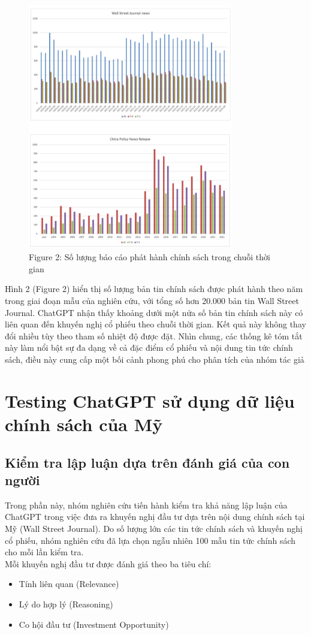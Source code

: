 \documentclass[a4paper,12pt]{article}
\begin{document}
\begin{figure}[H]
    \centering
    \includegraphics[width=0.8\textwidth]{fig/fig2.png}
    \caption*{Figure 2: Số lượng báo cáo phát hành chính sách trong chuỗi thời gian}
    \label{fig:fig2}
\end{figure}
Hình 2 (Figure 2) hiển thị số lượng bản tin chính sách được phát hành theo năm trong giai đoạn mẫu của nghiên cứu, với tổng số hơn 20.000 bản tin Wall Street Journal. ChatGPT nhận thấy khoảng dưới một nửa số bản tin chính sách này có liên quan đến khuyến nghị cổ phiếu theo chuỗi thời gian. Kết quả này không thay đổi nhiều tùy theo tham số nhiệt độ được đặt. Nhìn chung, các thống kê tóm tắt này làm nổi bật sự đa dạng về cả đặc điểm cổ phiếu và nội dung tin tức chính sách, điều này cung cấp một bối cảnh phong phú cho phân tích của nhóm tác giả

\section{Testing ChatGPT sử dụng dữ liệu chính sách của Mỹ}

\subsection{Kiểm tra lập luận dựa trên đánh giá của con người}
Trong phần này, nhóm nghiên cứu tiến hành kiểm tra khả năng lập luận của ChatGPT trong việc đưa ra khuyến nghị đầu tư dựa trên nội dung chính sách tại Mỹ (Wall Street Journal). Do số lượng lớn các tin tức chính sách và khuyến nghị cổ phiếu, nhóm nghiên cứu đã lựa chọn ngẫu nhiên 100 mẫu tin tức chính sách cho mỗi lần kiểm tra.
\\ Mỗi khuyến nghị đầu tư được đánh giá theo ba tiêu chí:\begin{itemize}
    \item Tính liên quan (Relevance)
    \item Lý do hợp lý (Reasoning)
    \item Co hội đầu tư (Investment Opportunity)
\end{itemize}
\end{document}
